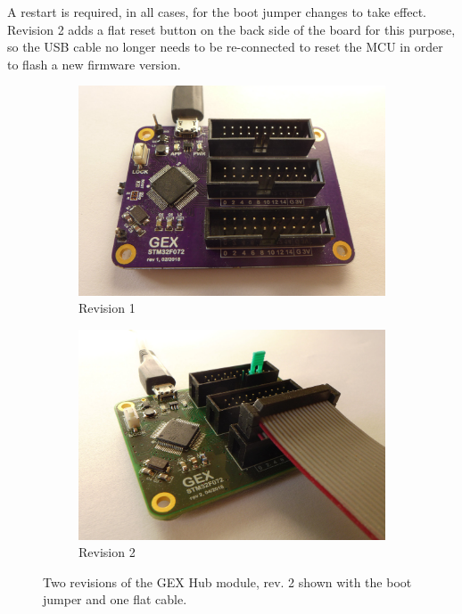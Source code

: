 A restart is required, in all cases, for the boot jumper changes to take effect. Revision 2 adds a flat reset button on the back side of the board for this purpose, so the \gls{USB} cable no longer needs to be re-connected to reset the \gls{MCU} in order to flash a new firmware version.

\begin{figure}[h]
	\centering
	\begin{subfigure}{.5\textwidth}
		\centering
		\includegraphics[width=.98\linewidth]{img/photo-hub1.jpg}
		\caption{\label{fig:gexhub1}Revision 1}
	\end{subfigure}%
	\begin{subfigure}{.5\textwidth}
		\centering
		\includegraphics[width=.98\linewidth]{img/photo-hub2.jpg}
		\caption{\label{fig:gexhub2}Revision 2}
	\end{subfigure}
	\caption[The GEX Hub module]{\label{fig:gexhub} Two revisions of the GEX Hub module, rev. 2 shown with the boot jumper and one flat cable.}
\end{figure}

